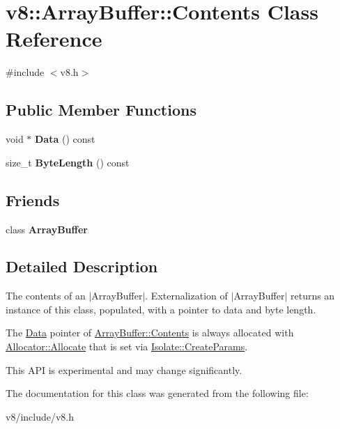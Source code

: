 \hypertarget{classv8_1_1ArrayBuffer_1_1Contents}{}\section{v8\+:\+:Array\+Buffer\+:\+:Contents Class Reference}
\label{classv8_1_1ArrayBuffer_1_1Contents}


{\ttfamily \#include $<$v8.\+h$>$}

\subsection*{Public Member Functions}
\begin{DoxyCompactItemize}
\item 
void $\ast$ {\bfseries Data} () const \hypertarget{classv8_1_1ArrayBuffer_1_1Contents_a9ed7556bfaca7a0b24deb05538a76dcd}{}\label{classv8_1_1ArrayBuffer_1_1Contents_a9ed7556bfaca7a0b24deb05538a76dcd}

\item 
size\+\_\+t {\bfseries Byte\+Length} () const \hypertarget{classv8_1_1ArrayBuffer_1_1Contents_a1b6a3eecb4fe05f4d33c83b6bc1fa737}{}\label{classv8_1_1ArrayBuffer_1_1Contents_a1b6a3eecb4fe05f4d33c83b6bc1fa737}

\end{DoxyCompactItemize}
\subsection*{Friends}
\begin{DoxyCompactItemize}
\item 
class {\bfseries Array\+Buffer}\hypertarget{classv8_1_1ArrayBuffer_1_1Contents_acbcb25033a90500a51aa19c811b2a1d3}{}\label{classv8_1_1ArrayBuffer_1_1Contents_acbcb25033a90500a51aa19c811b2a1d3}

\end{DoxyCompactItemize}


\subsection{Detailed Description}
The contents of an $\vert$\+Array\+Buffer$\vert$. Externalization of $\vert$\+Array\+Buffer$\vert$ returns an instance of this class, populated, with a pointer to data and byte length.

The \hyperlink{classv8_1_1Data}{Data} pointer of \hyperlink{classv8_1_1ArrayBuffer_1_1Contents}{Array\+Buffer\+::\+Contents} is always allocated with \hyperlink{classv8_1_1ArrayBuffer_1_1Allocator_a106b0d80120ed04fe9b9675e96f0340b}{Allocator\+::\+Allocate} that is set via \hyperlink{structv8_1_1Isolate_1_1CreateParams}{Isolate\+::\+Create\+Params}.

This A\+PI is experimental and may change significantly. 

The documentation for this class was generated from the following file\+:\begin{DoxyCompactItemize}
\item 
v8/include/v8.\+h\end{DoxyCompactItemize}
